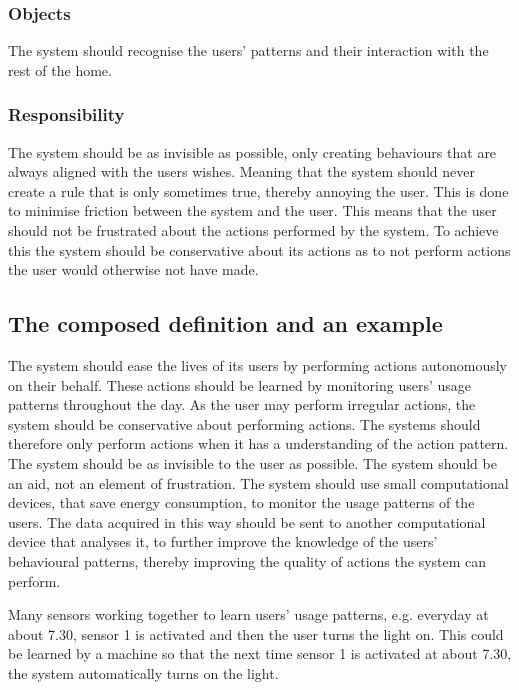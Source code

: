\subsubsection{Objects}

The system should recognise the users' patterns and their interaction with the
rest of the home.

\subsubsection{Responsibility}

The system should be as invisible as possible, only creating behaviours that are always aligned with the users wishes. Meaning that the system should never create a rule that is only sometimes true, thereby annoying the user. This is done to minimise friction between the system and the user. This means that the user should not be frustrated about the actions performed by the system. To achieve this the system should be conservative about its actions as to not perform actions the user would otherwise not have made.

\subsection{The composed definition and an example}

The system should ease the lives of its users by performing actions autonomously
on their behalf. These actions should be learned by monitoring users' usage
patterns throughout the day. As the user may perform irregular actions, the
system should be conservative about performing actions. The systems should
therefore only perform actions when it has a understanding of the action
pattern. The system should be as invisible to the user as possible. The system
should be an aid, not an element of frustration. The system should use small
computational devices, that save energy consumption, to monitor the usage
patterns of the users. The data acquired in this way should be sent to another
computational device that analyses it, to further improve the knowledge of the
users' behavioural patterns, thereby improving the quality of actions the system can perform.

Many sensors working together to learn users’ usage patterns, e.g. everyday at about 7.30, sensor 1 is activated and then the user turns the light on. This could be learned by a machine so that the next time sensor 1 is activated at about 7.30, the system automatically turns on the light.
